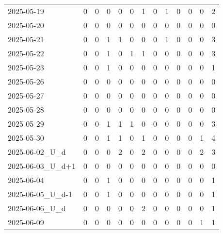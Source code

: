 \documentclass[dvipdfmx,oneside]{article}
\begin{document}
\begin{longtable}{lcccccccccccc}
        2025-05-19 &     0 &     0 &     0 &     0 &     0 &     1 &     0 &     1 &     0 &     0 &     0 &      2 \\
        2025-05-20 &     0 &     0 &     0 &     0 &     0 &     0 &     0 &     0 &     0 &     0 &     0 &      0 \\
        2025-05-21 &     0 &     0 &     1 &     1 &     0 &     0 &     0 &     1 &     0 &     0 &     0 &      3 \\
        2025-05-22 &     0 &     0 &     1 &     0 &     1 &     1 &     0 &     0 &     0 &     0 &     0 &      3 \\
        2025-05-23 &     0 &     0 &     1 &     0 &     0 &     0 &     0 &     0 &     0 &     0 &     0 &      1 \\
        2025-05-26 &     0 &     0 &     0 &     0 &     0 &     0 &     0 &     0 &     0 &     0 &     0 &      0 \\
        2025-05-27 &     0 &     0 &     0 &     0 &     0 &     0 &     0 &     0 &     0 &     0 &     0 &      0 \\
        2025-05-28 &     0 &     0 &     0 &     0 &     0 &     0 &     0 &     0 &     0 &     0 &     0 &      0 \\
        2025-05-29 &     0 &     0 &     1 &     1 &     1 &     0 &     0 &     0 &     0 &     0 &     0 &      3 \\
        2025-05-30 &     0 &     0 &     1 &     1 &     0 &     1 &     0 &     0 &     0 &     0 &     1 &      4 \\
  2025-06-02\_U\_d &     0 &     0 &     0 &     2 &     0 &     2 &     0 &     0 &     0 &     0 &     2 &      3 \\
2025-06-03\_U\_d+1 &     0 &     0 &     0 &     0 &     0 &     0 &     0 &     0 &     0 &     0 &     0 &      0 \\
        2025-06-04 &     0 &     0 &     1 &     0 &     0 &     0 &     0 &     0 &     0 &     0 &     0 &      1 \\
2025-06-05\_U\_d-1 &     0 &     0 &     1 &     0 &     0 &     0 &     0 &     0 &     0 &     0 &     0 &      1 \\
  2025-06-06\_U\_d &     0 &     0 &     0 &     0 &     0 &     2 &     0 &     0 &     0 &     0 &     0 &      1 \\
        2025-06-09 &     0 &     0 &     0 &     0 &     0 &     0 &     0 &     0 &     0 &     0 &     1 &      1 \\
\end{longtable}
\endgroup
\end{document}

